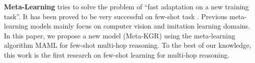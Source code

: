 \documentclass[11pt,a4paper]{article}
\begin{document}
\textbf{Meta-Learning} tries to solve the problem of ``fast adaptation on a new training task''. It has been proved to be very successful on few-shot task \cite{lake2015human, meta-translate}. Previous meta-learning models mainly focus on computer vision and imitation learning domains. In this paper, we propose a new model (Meta-KGR) using the meta-learning algorithm MAML \cite{MAML} for few-shot multi-hop reasoning. To the best of our knowledge, this work is the first research on few-shot learning for multi-hop reasoning.



\end{document}
